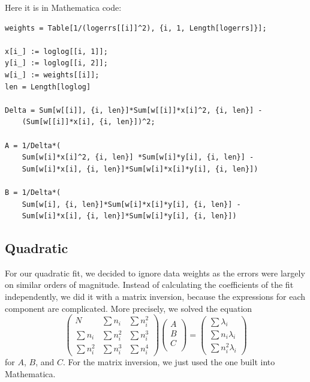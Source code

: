 \documentclass[12pt,twoside]{reedthesis}
\newcommand{\eqn}[1]{\begin{equation}#1\end{equation}}
\begin{document}
Here it is in Mathematica code:
\begin{Verbatim}
weights = Table[1/(logerrs[[i]]^2), {i, 1, Length[logerrs]}];

x[i_] := loglog[[i, 1]];
y[i_] := loglog[[i, 2]];
w[i_] := weights[[i]]; 
len = Length[loglog]

Delta = Sum[w[[i]], {i, len}]*Sum[w[[i]]*x[i]^2, {i, len}] -
	(Sum[w[[i]]*x[i], {i, len}])^2;

A = 1/Delta*(
	Sum[w[i]*x[i]^2, {i, len}] *Sum[w[i]*y[i], {i, len}] - 
	Sum[w[i]*x[i], {i, len}]*Sum[w[i]*x[i]*y[i], {i, len}])
	
B = 1/Delta*(
	Sum[w[i], {i, len}]*Sum[w[i]*x[i]*y[i], {i, len}] - 
	Sum[w[i]*x[i], {i, len}]*Sum[w[i]*y[i], {i, len}])
\end{Verbatim}

\subsection{Quadratic}
For our quadratic fit, we decided to ignore data weights as the errors were largely on similar orders of magnitude.  Instead of calculating the coefficients of the fit independently, we did it with a matrix inversion, because the expressions for each component are complicated. More precisely, we solved the equation
\eqn{
\left(
\begin{array}{ccc}
N & \sum n_i &  \sum n_i^2 \\
\sum n_i & \sum n_i ^2 & \sum n_i^3 \\
\sum n_i ^2 & \sum n_i^3 & \sum n_i ^4
\end{array}
\right)
\left(
\begin{array}{c}
A \\
B \\
C \\
\end{array}
\right)
=
\left(
\begin{array}{c}
\sum \lambda_i \\
\sum n_i \lambda_i \\
\sum n_i^2 \lambda_i
\end{array}
\right)
}
for $A$, $B$, and $C$. For the matrix inversion, we just used the one built into Mathematica. 
\end{document}

